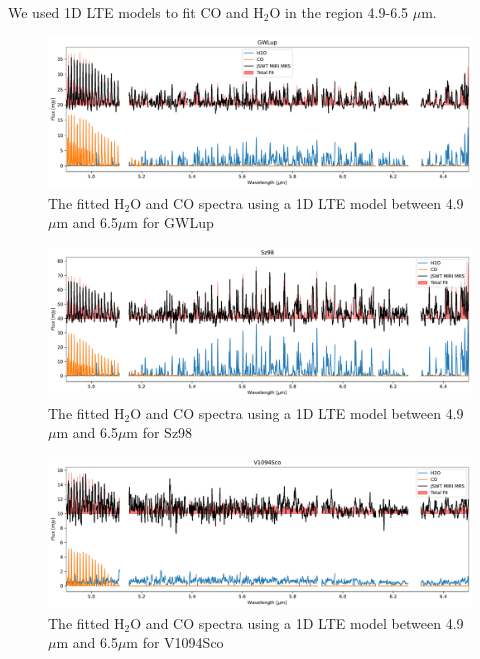 \documentclass[oneside, single, authoryear, semicolon]{lion-msc}
\newcommand{\4}{$_4$}
\newcommand{\3}{$_3$}
\newcommand{\2}{$_2$}
\begin{document}
We used 1D LTE models to fit CO and H\2O in the region 4.9-6.5 $\mu$m.

\begin{figure}[!ht]
    \centering
    \includegraphics[width=\linewidth]{Figures/Fit_GWLup.pdf}
    \caption{The fitted H\2O and CO spectra using a 1D LTE model between 4.9 $\mu$m and 6.5$\mu$m for GWLup}
    \label{fig: fit gwlup}
\end{figure}
\begin{figure}[!ht]
    \centering
    \includegraphics[width=\linewidth]{Figures/Fit_Sz98.pdf}
    \caption{The fitted H\2O and CO spectra using a 1D LTE model between 4.9 $\mu$m and 6.5$\mu$m for Sz98}
    \label{fig: fit sz98}
\end{figure}
\begin{figure}[!ht]
    \centering
    \includegraphics[width=\linewidth]{Figures/Fit_V1094Sco.pdf}
    \caption{The fitted H\2O and CO spectra using a 1D LTE model between 4.9 $\mu$m and 6.5$\mu$m for V1094Sco}
    \label{fig: v1094sco}
\end{figure}
\end{document}
